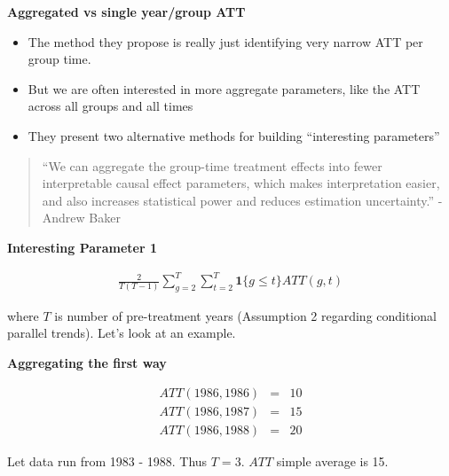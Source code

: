 \documentclass[notes=show]{beamer}
\begin{document}
\begin{frame}[plain]
\begin{center}
\textbf{Aggregated vs single year/group ATT}
\end{center}

\begin{itemize}
\item The method they propose is really just identifying very narrow ATT per group time.
\item But we are often interested in  more aggregate parameters, like the ATT across all groups and all times
\item They present two alternative methods for building ``interesting parameters''
\end{itemize}

\begin{quote}
``We can aggregate the group-time treatment effects into fewer interpretable causal effect parameters, which makes interpretation easier, and also increases statistical power and reduces estimation uncertainty.'' - Andrew Baker
\end{quote}

\end{frame}

\begin{frame}[plain]
\begin{center}
\textbf{Interesting Parameter 1}
\end{center}

\begin{eqnarray*}
\frac{2}{T(T-1)} \sum_{g=2}^T \sum_{t=2}^T \textbf{1}\{g \leq t\} ATT(g,t)
\end{eqnarray*}

where $T$ is number of pre-treatment years (Assumption 2 regarding conditional parallel trends).  Let's look at an example.

\end{frame}

\begin{frame}[plain]
\begin{center}
\textbf{Aggregating the first way}
\end{center}

\begin{eqnarray*}
ATT(1986,1986) &=& 10 \\
ATT(1986, 1987) &=& 15 \\
ATT(1986, 1988) &=& 20
\end{eqnarray*}

Let data run from 1983 - 1988.  Thus $T=3$.  $ATT$ simple average is 15.

\end{frame}
\end{document}
